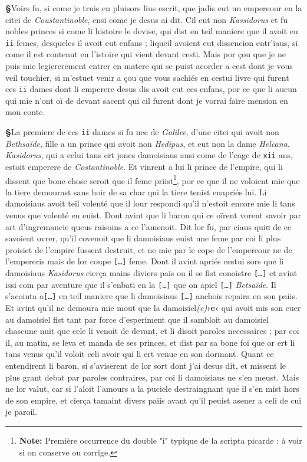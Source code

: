 \documentclass[12pt]{article} %
\newcommand{\colmar}[1]{\marginnote{[#1]}}          %
\newcommand{\persName}[1]{\emph{#1}} %
\newcommand{\placeName}[1]{\emph{#1}} %
\newcommand{\num}[1]{\texttt{#1}}    %
\newcommand{\corr}[2]{\emph{(#1)}\textbf{›#2‹}} %
\newcommand{\supplied}[1]{\textlangle#1\textrangle} %
\newcommand{\missing}{\texttt{[\ldots]}}     %
\newcommand{\fnnote}[1]{\footnote{\textbf{Note:} #1}} %
\newcommand{\del}[1]{\sout{#1}}      %
\newcounter{paranum}
\newcommand{\pnum}{\stepcounter{paranum}\textbf{§\arabic{paranum}}\quad}
\begin{document}
\pnum Voirs fu, si come je truis en pluisors lius escrit, que jadis eut un empereour en la citei de \placeName{Coustantinoble}, ensi come je desus ai dit. Cil eut non \persName{Kassidorus} et fu nobles princes si come li histoire le devise, qui dist en teil maniere que il avoit eu \num{ii} femes, desqueles il avoit eut enfans ; liqueil avoient eut dissencion entr'iaus, si come il est contenut en l'istoire qui vient devant cesti. Mais por çou que je ne puis mie legiererement entrer en matere qui se puist acorder a cest dont je vous veil touchier, si m'estuet venir a çou que vous sachiés en cestui livre qui furent ces \num{ii} dames dont li emperere desus dis avoit eut ces enfans, por ce que li aucun qui mie n'ont oï de devant sacent qui cil furent dont je vorrai faire mension en mon conte.

\pnum La premiere de ces \num{ii} dames si fu nee de \placeName{Galilee}, d'une citei qui avoit non \placeName{Bethsaïde}, fille a un prince qui avoit non \persName{Hedipus}, et eut non la dame \persName{Helcana}. \persName{Kasidorus}, qui a celui tans ert jones damoisiaus ausi come de l'eage de \num{xii} ans, estoit emperere de \placeName{Costantinoble}. Et vinrent a lui li prince de l'empire, qui li dissent que bone chose seroit que il feme priist\fnnote{Première occurrence du double "i" typique de la scripta picarde : à voir si on conserve ou corrige.}, por ce que il ne voloient mie que la tiere demourast sans hoir de sa char qui la tiere tenist enapriés lui. Li damoisiaus avoit teil volenté que il lour respondi qu'il n'estoit encore mie li tans venus que volenté en euist. Dont avint que li baron qui ce oïrent vorent savoir par art d'ingremancie queus raisoins a ce l'amenoit. Dit lor fu, par ciaus qui\del{u} de ce savoient ovrer, qu'il covenoit que li damoisiaus euist une feme par coi li plus proisiet de l'empire fussent destruit, et ne mie par le cope de l'empereour ne de l'empereris mais de lor coupe \missing{} feme. Dont il avint apriés cestui sors que li damoisiaus \persName{Kasidorus} cierça mains diviers païs ou il se fist conoistre \missing{} et avint issi com par aventure que il s'enbati en la \missing{} que on apiel \missing{} \placeName{Betsaïde}. Il s'acointa a\missing{} en teil maniere que li damoisiaus \missing{} anchois repaira en son \colmar{1rb}\colmar{b} paiis. Et avint qu'il ne demoura mie mout que la damoisiel\corr{e}{e} qui avoit mis son cuer au damoisiel fist tant par force d'esperiment que il sambloit au damoisiel chascune nuit que cele li venoit de devant, et li disoit paroles necessaires ; par coi il, au matin, se leva et manda de ses p\supplied{r}inces, et dist par sa bone foi que or ert li tans venus qu'il voloit celi avoir qui li ert venue en son dormant. Quant ce entendirent li baron, si s'aviserent de lor sort dont j'ai desus dit, et missent le plus grant debat par paroles contraires, par coi li damoisiaus ne s'en meust. Mais ne lor valut, car si l'aloit l'amours a la puciele destraingnant que il s'en mist hors de son empire, et cierça tamaint divers paiis avant qu'il peuist asener a celi de cui je paroil.
\end{document}
